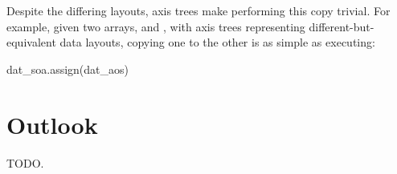 \documentclass[thesis]{subfiles}
\begin{document}
Despite the differing layouts, axis trees make performing this copy trivial.
For example, given two arrays,  and , with axis trees representing different-but-equivalent data layouts, copying one to the other is as simple as executing:
\begin{pyinline}
  dat_soa.assign(dat_aos)
\end{pyinline}

\section{Outlook}

TODO.
\end{document}
